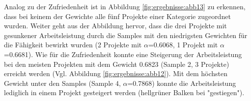 Analog zu der Zufriedenheit ist in Abbildung \ref{fig:ergebnisse:abb13} zu erkennen, dass bei keinem der Gewichte alle fünf Projekte einer Kategorie zugeordnet wurden.
Weiter geht aus der Abbildung hervor, dass die drei Projekte mit gesunkener Arbeitsleistung durch die Samples mit den niedrigsten Gewichten für die Fähigkeit bewirkt wurden (2 Projekte mit $\alpha$=0.6068, 1 Projekt mit $\alpha$=0.6681).
Wie für die Zufriedenheit konnte eine Steigerung der Arbeitsleistung bei den meisten Projekten mit dem Gewicht 0.6823 (Sample 2, 3 Projekte) erreicht werden (Vgl. Abbildung \ref{fig:ergebnisse:abb12}).
Mit dem höchsten Gewicht unter den Samples (Sample 4, $\alpha$=0.7868) konnte die Arbeitsleistung lediglich in einem Projekt gesteigert werden (hellgrüner Balken bei "gestiegen").

